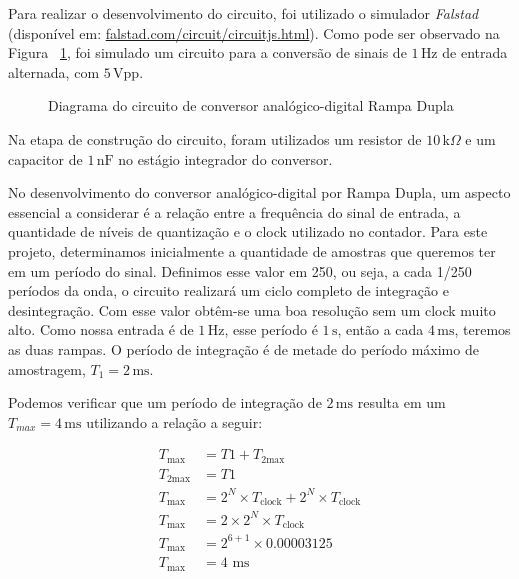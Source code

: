 Para realizar o desenvolvimento do circuito, foi utilizado o simulador \textit{Falstad} (disponível em: \href{https://www.falstad.com/circuit/circuitjs.html}{falstad.com/circuit/circuitjs.html}). Como pode ser observado na Figura ~\ref{fig:circuit_svg}, foi simulado um circuito para a conversão de sinais de $1\, \text{Hz}$ de entrada alternada, com $5\, \text{Vpp}$.


\begin{figure}[H]
    \centering
    \resizebox{1\linewidth}{!}{%
        
    }
    \caption{Diagrama do circuito de conversor analógico-digital Rampa Dupla}
    \label{fig:circuit_svg}
\end{figure}

Na etapa de construção do circuito, foram utilizados um resistor de $10\, \text{k} \Omega$ e um capacitor de $1\, \text{nF}$ no estágio integrador do conversor.

No desenvolvimento do conversor analógico-digital por Rampa Dupla, um aspecto essencial a considerar é a relação entre a frequência do sinal de entrada, a quantidade de níveis de quantização e o clock utilizado no contador. Para este projeto, determinamos inicialmente a quantidade de amostras que queremos ter em um período do sinal. Definimos esse valor em 250, ou seja, a cada 1/250 períodos da onda, o circuito realizará um ciclo completo de integração e desintegração. Com esse valor obtêm-se uma boa resolução sem um clock muito alto. Como nossa entrada é de $1\, \text{Hz}$, esse período é $1\,\text{s}$, então a cada $4\, \text{ms}$, teremos as duas rampas. O período de integração é de metade do período máximo de amostragem, $T_{1} = 2\, \text{ms}$.

Podemos verificar que um período de integração de $2\, \text{ms}$ resulta em um $T_{max} = 4\, \text{ms}$ utilizando a relação a seguir:

\begin{align*}
    T_{\text{max}}  & = T1 + T_{2\text{max}}                                          \\
    T_{2\text{max}} & = T1                                                            \\
    T_{\text{max}}  & = 2^{N} \times T_{\text{clock}} + 2^{N} \times T_{\text{clock}} \\
    T_{\text{max}}  & = 2 \times 2^{N} \times T_{\text{clock}}                        \\
    T_{\text{max}}  & = 2^{6+1} \times 0.00003125                                     \\
    T_{\text{max}}  & = 4 \text{ ms}
\end{align*}


